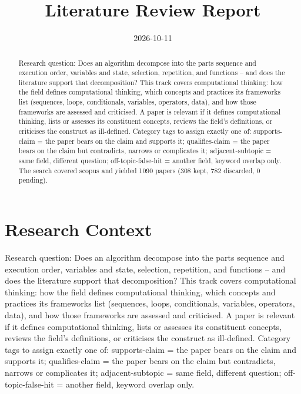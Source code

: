 \documentclass{article}
\title{Literature Review Report}
\date{2026-10-11}
\begin{document}
\maketitle

\begin{abstract}
Research question: Does an algorithm decompose into the parts sequence and execution order, variables and state, selection, repetition, and functions -- and does the literature support that decomposition? This track covers computational thinking: how the field defines computational thinking, which concepts and practices its frameworks list (sequences, loops, conditionals, variables, operators, data), and how those frameworks are assessed and criticised. A paper is relevant if it defines computational thinking, lists or assesses its constituent concepts, reviews the field's definitions, or criticises the construct as ill-defined. Category tags to assign exactly one of: supports-claim = the paper bears on the claim and supports it; qualifies-claim = the paper bears on the claim but contradicts, narrows or complicates it; adjacent-subtopic = same field, different question; off-topic-false-hit = another field, keyword overlap only. The search covered scopus and yielded 1090 papers (308 kept, 782 discarded, 0 pending).
\end{abstract}
\clearpage
\clearpage
\tableofcontents
\clearpage

\section{Research Context}
Research question: Does an algorithm decompose into the parts sequence
and execution order, variables and state, selection, repetition, and
functions -- and does the literature support that decomposition? This
track covers computational thinking: how the field defines computational
thinking, which concepts and practices its frameworks list (sequences,
loops, conditionals, variables, operators, data), and how those
frameworks are assessed and criticised. A paper is relevant if it
defines computational thinking, lists or assesses its constituent
concepts, reviews the field's definitions, or criticises the construct
as ill-defined. Category tags to assign exactly one of: supports-claim =
the paper bears on the claim and supports it; qualifies-claim = the
paper bears on the claim but contradicts, narrows or complicates it;
adjacent-subtopic = same field, different question; off-topic-false-hit
= another field, keyword overlap only.
\end{document}
